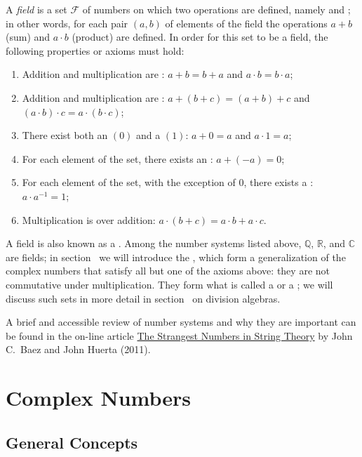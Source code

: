 A \textit{field} is a set $\mathcal{F}$ of numbers on which two operations are defined, namely  and ; in other words, for each pair $(a,b)$ of elements of the field the operations $a+b$ (sum) and $a\cdot b$ (product) are defined.  In order for this set to be a field, the following properties or axioms must hold:
\begin{enumerate}
\item Addition and multiplication are : $a+b=b+a$ and $a\cdot b=b\cdot a$;
\item Addition and multiplication are : $a+(b+c)=(a+b)+c$ and $(a\cdot b)\cdot c=a\cdot (b\cdot c)$;
\item There exist both an  $(0)$ and a  $(1)$: $a+0=a$ and $a\cdot 1=a$;
\item For each element of the set, there exists an : $a+(-a)=0$;
\item For each element of the set, with the exception of $0$, there exists a : $a\cdot a^{-1} = 1$;
\item Multiplication is  over addition: $a\cdot(b+c)=a\cdot b+a\cdot c$.
\end{enumerate}
A field is also known as a .  Among the number systems listed above, $\mathbb{Q}$, $\mathbb{R}$, and $\mathbb{C}$ are fields; in section~ we will introduce the , which form a generalization of the complex numbers that satisfy all but one of the axioms above: they are not commutative under multiplication.  They form what is called a  or a ; we will discuss such sets in more detail in section~ on division algebras.

A brief and accessible review of number systems and why they are important can be found in the on-line article {\color{OCblue}\href{https://smphysics.wordpress.com/wp-content/uploads/2011/08/numero_extrano_cuerdas.pdf}{The Strangest Numbers in String Theory}} by John C.\ Baez and John Huerta (2011).


\section{Complex Numbers}

\subsection{General Concepts}

